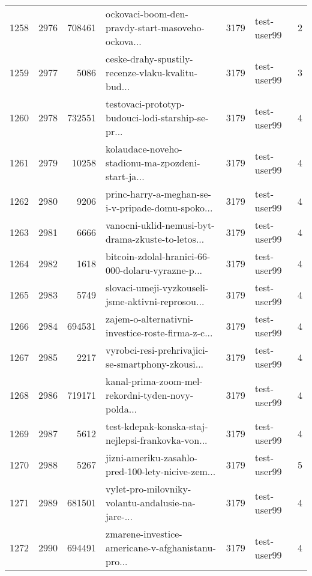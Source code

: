 \begin{tabular}{lrrlrlr}
1258 &       2976 &   708461 &  ockovaci-boom-den-pravdy-start-masoveho-ockova... &     3179 &                  test-user99 &               2 \\
1259 &       2977 &     5086 &  ceske-drahy-spustily-recenze-vlaku-kvalitu-bud... &     3179 &                  test-user99 &               3 \\
1260 &       2978 &   732551 &  testovaci-prototyp-budouci-lodi-starship-se-pr... &     3179 &                  test-user99 &               4 \\
1261 &       2979 &    10258 &  kolaudace-noveho-stadionu-ma-zpozdeni-start-ja... &     3179 &                  test-user99 &               4 \\
1262 &       2980 &     9206 &  princ-harry-a-meghan-se-i-v-pripade-domu-spoko... &     3179 &                  test-user99 &               4 \\
1263 &       2981 &     6666 &  vanocni-uklid-nemusi-byt-drama-zkuste-to-letos... &     3179 &                  test-user99 &               4 \\
1264 &       2982 &     1618 &  bitcoin-zdolal-hranici-66-000-dolaru-vyrazne-p... &     3179 &                  test-user99 &               4 \\
1265 &       2983 &     5749 &  slovaci-umeji-vyzkouseli-jsme-aktivni-reprosou... &     3179 &                  test-user99 &               4 \\
1266 &       2984 &   694531 &  zajem-o-alternativni-investice-roste-firma-z-c... &     3179 &                  test-user99 &               4 \\
1267 &       2985 &     2217 &  vyrobci-resi-prehrivajici-se-smartphony-zkousi... &     3179 &                  test-user99 &               4 \\
1268 &       2986 &   719171 &  kanal-prima-zoom-mel-rekordni-tyden-novy-polda... &     3179 &                  test-user99 &               4 \\
1269 &       2987 &     5612 &  test-kdepak-konska-staj-nejlepsi-frankovka-von... &     3179 &                  test-user99 &               4 \\
1270 &       2988 &     5267 &  jizni-ameriku-zasahlo-pred-100-lety-nicive-zem... &     3179 &                  test-user99 &               5 \\
1271 &       2989 &   681501 &  vylet-pro-milovniky-volantu-andalusie-na-jare-... &     3179 &                  test-user99 &               4 \\
1272 &       2990 &   694491 &  zmarene-investice-americane-v-afghanistanu-pro... &     3179 &                  test-user99 &               4 \\

\end{tabular}
